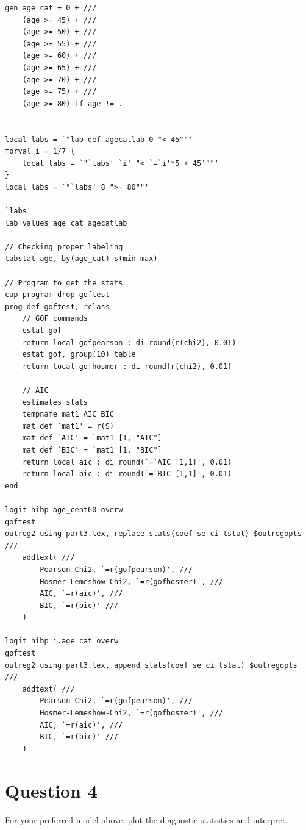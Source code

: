 \documentclass{article}
\begin{document}
\begin{enumerate}[a.]
\begin{verbatim}
gen age_cat = 0 + ///
    (age >= 45) + ///
    (age >= 50) + ///
    (age >= 55) + ///
    (age >= 60) + ///
    (age >= 65) + ///
    (age >= 70) + ///
    (age >= 75) + ///
    (age >= 80) if age != .


local labs = `"lab def agecatlab 0 "< 45""'
forval i = 1/7 {
    local labs = `"`labs' `i' "< `=`i'*5 + 45'""'
}
local labs = `"`labs' 8 ">= 80""'

`labs'
lab values age_cat agecatlab 

// Checking proper labeling
tabstat age, by(age_cat) s(min max)

// Program to get the stats
cap program drop goftest
prog def goftest, rclass
    // GOF commands
    estat gof
    return local gofpearson : di round(r(chi2), 0.01)
    estat gof, group(10) table
    return local gofhosmer : di round(r(chi2), 0.01)
    
    // AIC
    estimates stats
    tempname mat1 AIC BIC
    mat def `mat1' = r(S)
    mat def `AIC' = `mat1'[1, "AIC"]
    mat def `BIC' = `mat1'[1, "BIC"]
    return local aic : di round(`=`AIC'[1,1]', 0.01)
    return local bic : di round(`=`BIC'[1,1]', 0.01)
end

logit hibp age_cent60 overw
goftest
outreg2 using part3.tex, replace stats(coef se ci tstat) $outregopts ///
    addtext( ///
        Pearson-Chi2, `=r(gofpearson)', ///
        Hosmer-Lemeshow-Chi2, `=r(gofhosmer)', ///
        AIC, `=r(aic)', ///
        BIC, `=r(bic)' ///
    )

logit hibp i.age_cat overw
goftest
outreg2 using part3.tex, append stats(coef se ci tstat) $outregopts ///
    addtext( ///
        Pearson-Chi2, `=r(gofpearson)', ///
        Hosmer-Lemeshow-Chi2, `=r(gofhosmer)', ///
        AIC, `=r(aic)', ///
        BIC, `=r(bic)' ///
    )
\end{verbatim}

    
\end{enumerate}

\section{Question 4}
 For your preferred model above, plot the diagnostic statistics and interpret. 
 
\end{document}
